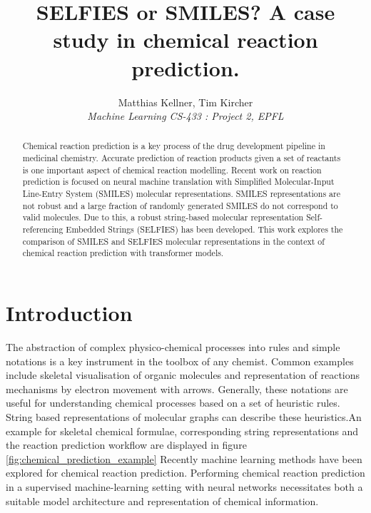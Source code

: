 \documentclass[10pt,conference,compsocconf]{IEEEtran}
\begin{document}
\title{SELFIES or SMILES? A case study in chemical reaction prediction.}

\author{
  Matthias Kellner, Tim Kircher\\
  \textit{Machine Learning CS-433 : Project 2, EPFL}
}

\maketitle

\begin{abstract}
    Chemical reaction prediction is a key process of the drug development pipeline in medicinal chemistry. Accurate prediction of reaction products given a set of reactants is one important aspect of chemical reaction modelling. Recent work on reaction prediction is focused on neural machine translation with Simplified Molecular-Input Line-Entry System (SMILES) molecular representations. SMILES representations are not robust and a large fraction of randomly generated SMILES do not correspond to valid molecules. Due to this, a robust string-based molecular representation Self-referencing Embedded Strings (SELFIES) has been developed. This work explores the comparison of SMILES and SELFIES molecular representations in the context of chemical reaction prediction with transformer models.
\end{abstract}

\section{Introduction}

The abstraction of complex physico-chemical processes into rules and simple notations is a key instrument in the toolbox of any chemist. Common examples include skeletal visualisation of organic molecules and representation of reactions mechanisms by electron movement with arrows. Generally, these notations are useful for understanding chemical processes based on a set of heuristic rules. String based representations of molecular graphs can describe these heuristics.An example for skeletal chemical formulae, corresponding string representations and the reaction prediction workflow are displayed in figure \ref{fig:chemical_prediction_example}
Recently machine learning methods have been explored for chemical reaction prediction.\cite{ReactionPredictionReview,MolecularTransformer} Performing chemical reaction prediction in a supervised machine-learning setting with neural networks necessitates both a suitable model architecture and representation of chemical information. 
\end{document}
